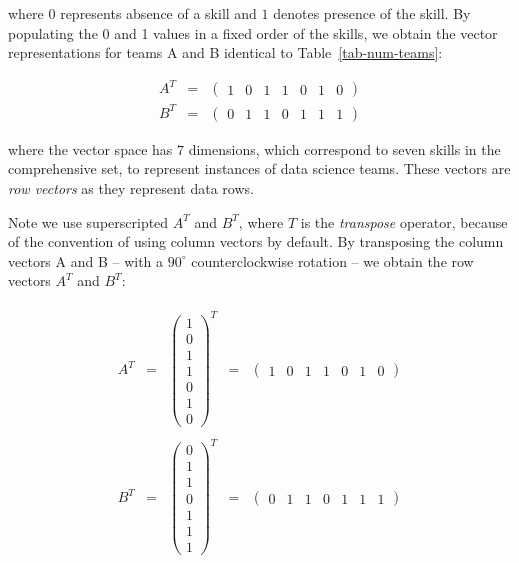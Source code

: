 \documentclass[
  letterpaper,
]{scrbook}
\begin{document}
where \(0\) represents absence of a skill and \(1\) denotes presence of
the skill. By populating the 0 and 1 values in a fixed order of the
skills, we obtain the vector representations for teams A and B identical
to Table~\hyperref[tab-num-teams]{{[}tab-num-teams{]}}:

\[\begin{aligned}
  A^T     & = & \begin{pmatrix} 1 & 0 & 1 & 1 & 0 & 1 & 0 \end{pmatrix} \\
  B^T     & = & \begin{pmatrix} 0 & 1 & 1 & 0 & 1 & 1 & 1 \end{pmatrix}
\end{aligned}\]

where the vector space has \(7\) dimensions, which correspond to seven
skills in the comprehensive set, to represent instances of data science
teams. These vectors are \emph{row vectors} as they represent data rows.

Note we use superscripted \(A^T\) and \(B^T\), where \(T\) is the
\emph{transpose} operator, because of the convention of using column
vectors by default. By transposing the column vectors A and B -- with a
\(90^\circ\) counterclockwise rotation -- we obtain the row vectors
\(A^T\) and \(B^T\):

\[\begin{aligned}
\begin{matrix}
  A^T     & = & \begin{pmatrix} 1 \\ 0 \\ 1 \\ 1 \\ 0 \\ 1 \\ 0 \end{pmatrix}^T
          & = & \begin{pmatrix} 1 & 0 & 1 & 1 & 0 & 1 & 0 \end{pmatrix}
  \\
  \\
  B^T     & = & \begin{pmatrix} 0 \\ 1 \\ 1 \\ 0 \\ 1 \\ 1 \\ 1 \end{pmatrix}^T
          & = & \begin{pmatrix} 0 & 1 & 1 & 0 & 1 & 1 & 1 \end{pmatrix}
\end{matrix}
\end{aligned}\]
\end{document}

